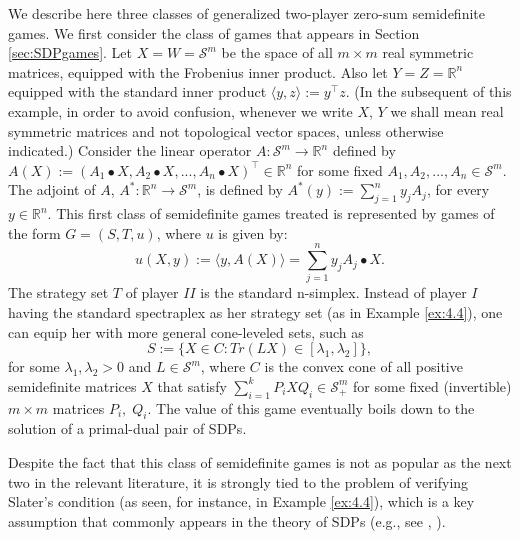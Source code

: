 \documentclass[11pt, twoside]{article}
\numberwithin{equation}{section}
\theoremstyle{definition}
\begin{document}
 We describe here three classes of generalized two-player zero-sum semidefinite games. We first consider the class of games that appears in Section \ref{sec:SDPgames}. Let $X=W=\mathcal{S}^{m}$ be the space of all $m\times m$ real symmetric matrices, equipped with the Frobenius inner product. Also let $Y=Z=\mathbb{R}^{n}$ equipped with the standard inner product $\langle y,z\rangle:= y^{\top}z$. (In the subsequent of this example, in order to avoid confusion, whenever we write $X$, $Y$ we shall mean real symmetric matrices and not topological vector spaces, unless otherwise indicated.) Consider the linear operator $A:\mathcal{S}^{m}\rightarrow \mathbb{R}^{n}$ defined by $A(X):= (A_1\bullet X,A_2\bullet X,...,A_n\bullet X)^{\top}\in\mathbb{R}^{n}$ for some fixed $A_1,A_2,...,A_n\in\mathcal{S}^{m}$. The adjoint of $A$, $A^*:\mathbb{R}^{n}\rightarrow\mathcal{S}^{m}$, is defined by $A^*(y):= \sum_{j=1}^{n}y_jA_j$, for every $y\in\mathbb{R}^n$. This first class of semidefinite games treated is represented by games of the form $G=(S,T,u)$, where $u$ is given by:
\begin{equation*}
    u(X,y):= \langle y,A(X)\rangle=\sum_{j=1}^{n}y_jA_j\bullet X.
\end{equation*}
The strategy set $T$ of player $II$ is the standard n-simplex. Instead of player $I$ having the standard spectraplex as her strategy set (as in Example \ref{ex:4.4}), one can equip her with more general cone-leveled sets, such as
\begin{equation*}
    S:= \bigl\{X\in C: Tr(LX)\in[\lambda_1,\lambda_2]\bigr\},
\end{equation*}
for some $\lambda_1,\lambda_2>0$ and $L\in\mathcal{S}^m$, where $C$ is the convex cone of all positive semidefinite matrices $X$ that satisfy $\sum_{i=1}^{k}P_iXQ_i\in\mathcal{S}^{m}_{+}$ for some fixed (invertible) $m\times m$ matrices $P_i,\;Q_i$. The value of this game eventually boils down to the solution of a primal-dual pair of SDPs.\par
Despite the fact that this class of semidefinite games is not as popular as the next two in the relevant literature, it is strongly tied to the problem of verifying Slater's condition (as seen, for instance, in Example \ref{ex:4.4}), which is a key assumption that commonly appears in the theory of SDPs (e.g., see \cite{pataki2024exponential}, \cite[pp. 46, 76]{wolkowicz2012handbook}).\par
\end{document}
